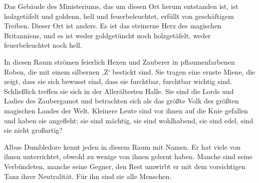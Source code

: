 Das Gebäude des Ministeriums, das um diesen Ort herum entstanden ist, ist holzgetäfelt und goldenn, hell und feuerbeleuchtet, erfüllt von geschäftigem Treiben. Dieser Ort ist anders. Es ist das steinerne Herz des magischen Britanniens, und es ist weder goldgetüncht noch holzgetäfelt, weder feuerbeleuchtet noch hell.

In diesen Raum strömen feierlich Hexen und Zauberer in pflaumenfarbenen Roben, die mit einem silbernen ‚Z‘ bestickt sind. Sie tragen eine ernste Miene, die zeigt, dass sie sich bewusst sind, dass sie furchtbar, furchtbar wichtig sind. Schließlich treffen sie sich in der Allerältesten Halle. Sie sind die Lords und Ladies des Zaubergamot und betrachten sich als das größte Volk des größten magischen Landes der Welt. Kleinere Leute sind vor ihnen auf die Knie gefallen und haben sie angefleht; sie sind mächtig, sie sind wohlhabend, sie sind edel, sind sie nicht großartig?

Albus Dumbledore kennt jeden in diesem Raum mit Namen. Er hat viele von ihnen unterrichtet, obwohl zu wenige von ihnen gelernt haben. Manche sind seine Verbündeten, manche seine Gegner, den Rest umwirbt er mit dem vorsichtigen Tanz ihrer Neutralität. Für ihn sind sie alle Menschen.

